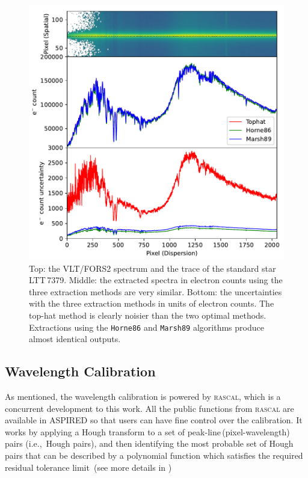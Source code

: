 \documentclass[linenumbers, twocolumn]{aastex631}
\begin{document}
\begin{figure}
    \centering
    \includegraphics[width=\columnwidth]{fig_04_extraction_compared.pdf}
    \caption{Top: the VLT/FORS2 spectrum and the trace of the standard
    star LTT\,7379. Middle: the extracted spectra in electron counts
    using the three extraction methods are very similar. Bottom: the
    uncertainties with the three extraction methods in units of electron counts.
    The top-hat method is clearly noisier than the two optimal methods.
    Extractions using the \texttt{Horne86} and \texttt{Marsh89} algorithms produce
    almost identical outputs.}
    \label{fig:extraction_compared}
\end{figure}

\subsection{Wavelength Calibration}
As mentioned, the wavelength calibration is powered by \textsc{rascal}, which is
a concurrent development to this work. All the public functions from
\textsc{rascal} are available in \textsc{ASPIRED} so that users can have fine control
over the calibration. It works by applying a Hough transform to a set of
peak-line\,(pixel-wavelength) pairs (i.e.,~Hough pairs), and then identifying the
most probable set of Hough pairs that can be described by a polynomial
function which satisfies the required residual tolerance limit~(see more
details in \citealt{2020ASPC..527..627V})
\end{document}
